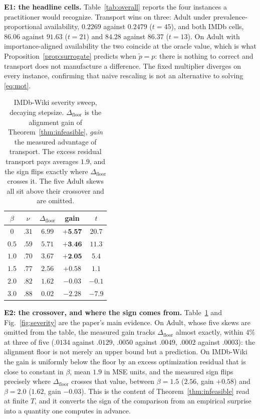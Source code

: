 \documentclass{article}
\theoremstyle{definition}
\newcommand{\best}[1]{\textbf{#1}}
\begin{document}
\noindent\textbf{E1: the headline cells.}
Table~\ref{tab:overall} reports the four instances a practitioner would
recognize. Transport wins on three: Adult under prevalence-proportional
availability, $0.2269$ against $0.2479$ ($t{=}45$), and both IMDb cells,
$86.06$ against $91.63$ ($t{=}21$) and $84.28$ against $86.37$ ($t{=}13$). On
Adult with importance-aligned availability the two coincide at the oracle
value, which is what Proposition~\ref{prop:surrogate} predicts when
$\tilde p=p$: there is nothing to correct and transport does not manufacture a
difference. The fixed multiplier diverges on every instance, confirming that
naive rescaling is not an alternative to solving \eqref{eq:mot}.

\begin{table}[t]
\centering
\caption{IMDb-Wiki severity sweep, decaying stepsize. $\Delta_{\mathrm{floor}}$
is the alignment gain of Theorem~\ref{thm:infeasible}, \emph{gain} the measured
advantage of transport. The excess residual transport pays averages $1.9$, and
the sign flips exactly where $\Delta_{\mathrm{floor}}$ crosses it. The five
Adult skews all sit above their crossover and are omitted.}
\label{tab:severity}
\setlength{\tabcolsep}{3.0pt}
\begin{tabular}{ccccc}
\toprule
$\beta$ & $\nu$ & $\Delta_{\mathrm{floor}}$ & gain & $t$ \\
\midrule
$0$   & $.31$ & $6.99$ & $\best{+5.57}$ & $20.7$ \\
$0.5$ & $.59$ & $5.71$ & $\best{+3.46}$ & $11.3$ \\
$1.0$ & $.70$ & $3.67$ & $\best{+2.05}$ & $5.4$ \\
$1.5$ & $.77$ & $2.56$ & $+0.58$ & $1.1$ \\
$2.0$ & $.82$ & $1.62$ & $-0.03$ & $-0.1$ \\
$3.0$ & $.88$ & $0.02$ & $-2.28$ & $-7.9$ \\
\bottomrule
\end{tabular}
\end{table}

\noindent\textbf{E2: the crossover, and where the sign comes from.}
Table~\ref{tab:severity} and Fig.~\ref{fig:severity} are the paper's main
evidence. On Adult, whose five skews are omitted from the table, the measured gain tracks
$\Delta_{\mathrm{floor}}$ almost exactly, within $4\%$ at three of five
($.0134$ against $.0129$, $.0050$ against $.0049$, $.0002$ against $.0003$):
the alignment floor is not merely an upper bound but a prediction. On IMDb-Wiki the gain is
uniformly below the floor by an excess optimization residual that is close to
constant in $\beta$, mean $1.9$ in MSE units, and the measured sign flips
precisely where $\Delta_{\mathrm{floor}}$ crosses that value, between
$\beta{=}1.5$ ($2.56$, gain $+0.58$) and $\beta{=}2.0$ ($1.62$, gain $-0.03$).
This is the content of Theorem~\ref{thm:infeasible} read at finite $T$, and it
converts the sign of the comparison from an empirical surprise into a quantity
one computes in advance.
\end{document}
